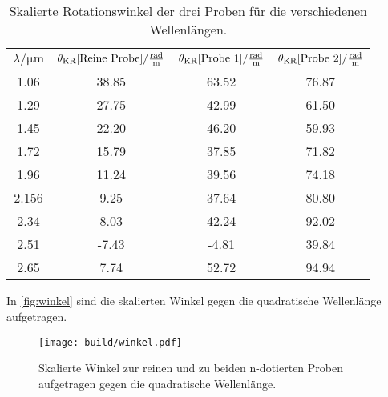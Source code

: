 \begin{table}[H]
     \caption{Skalierte Rotationswinkel der drei Proben für die verschiedenen Wellenlängen.}
    \label{tab:skaliert}
    \centering
    \begin{tabular}{cccc}
        \toprule
        {$\lambda / \si{\micro\meter}$} & {$\theta_{\text{KR}} \text{[Reine Probe]}/ \si[per-mode=fraction]{\radian\per\meter}$} & {$\theta_{\text{KR}} \text{[Probe 1]}/ \si[per-mode=fraction]{\radian\per\meter}$} & {$\theta_{\text{KR}} \text{[Probe 2]}/ \si[per-mode=fraction]{\radian\per\meter}$} \\
        \midrule
     1.06 &  38.85 &  63.52   &   76.87 \\
     1.29 &  27.75 &  42.99   &   61.50 \\
     1.45 &  22.20 &  46.20   &   59.93 \\
     1.72 &  15.79 &  37.85   &   71.82 \\
     1.96 &  11.24  & 39.56  &   74.18 \\
     2.156&  9.25  &  37.64   &   80.80 \\
     2.34 &  8.03  &  42.24   &   92.02 \\
     2.51 &  -7.43 &  -4.81   &   39.84 \\
     2.65 &  7.74 &  52.72   &   94.94 \\
        
        \bottomrule
    \end{tabular}
\end{table}

In \autoref{fig:winkel} sind die skalierten Winkel gegen die quadratische Wellenlänge aufgetragen.
\begin{figure}[H]
    \centering
    \texttt{[image: build/winkel.pdf]}
    \caption{Skalierte Winkel zur reinen und zu beiden n-dotierten Proben aufgetragen gegen die quadratische Wellenlänge.}
    \label{fig:winkel}
\end{figure}


